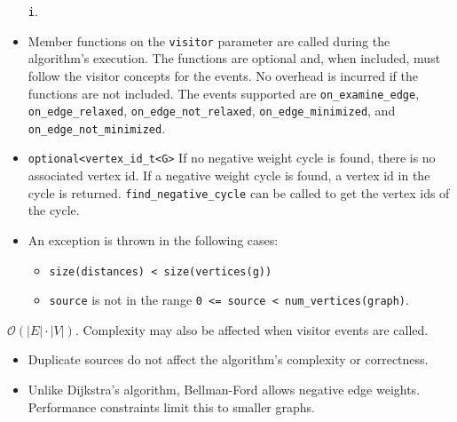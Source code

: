 \begin{itemdescr}
\begin{itemize}
                        \lstinline{i}.
                  \item Member functions on the \lstinline{visitor} parameter are called during the algorithm's execution.
                        The functions are optional and, when included, must follow the visitor concepts for the events.
                        No overhead is incurred if the functions are not included.
                        The events supported are \lstinline{on_examine_edge}, \lstinline{on_edge_relaxed}, \lstinline{on_edge_not_relaxed},
                        \lstinline{on_edge_minimized}, and \lstinline{on_edge_not_minimized}.
            \end{itemize}
      \pnum\returns 
            \begin{itemize}
                  \item \lstinline{optional<vertex_id_t<G>} If no negative weight cycle is found, 
                        there is no associated vertex id. If a negative weight cycle is found, a
                        vertex id in the cycle is returned. \lstinline{find_negative_cycle}
                        can be called to get the vertex ids of the cycle.
            \end{itemize}
      \pnum\throws 
            \begin{itemize}
                  \item An  exception is thrown in the following cases:
                        \begin{itemize}
                              \item \lstinline{size(distances) < size(vertices(g))}
                              \item \lstinline{source} is not in the range \lstinline{0 <= source < num_vertices(graph)}.
                        \end{itemize}
            \end{itemize}
      \pnum\complexity $\mathcal{O}(|E| \cdot |V|)$. Complexity may also be affected when visitor events are called. \\
      \pnum\remarks 
            \begin{itemize}
                  \item Duplicate sources do not affect the algorithm's complexity or correctness.
                  \item Unlike Dijkstra's algorithm, Bellman-Ford allows negative edge weights. 
                        Performance constraints limit this to smaller graphs.
            \end{itemize}
\end{itemdescr}

